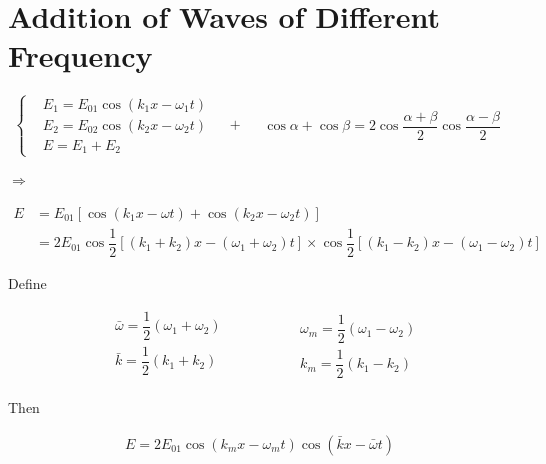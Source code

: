 \section{Addition of Waves of Different Frequency}

\begin{equation*}
  \left\{
    \begin{aligned}
      & E_1 = E_{01} \cos \left( k_1 x - \omega_1 t \right) \\
      & E_2 = E_{02} \cos \left( k_2 x - \omega_2 t \right) \\
      & E = E_1 + E_2
    \end{aligned}
  \right.
  \quad + \quad 
  \begin{aligned}
    \cos \alpha + \cos \beta = 2 \cos \dfrac{\alpha + \beta}{2} \cos \dfrac{\alpha - \beta}{2}  
  \end{aligned}
\end{equation*}

$\Rightarrow$

\begin{equation*}
  \begin{aligned}
    E &= E_{01} \left[ \cos \left( k_1 x - \omega t \right) + \cos \left( k_2 x - \omega_2 t \right) \right] \\
    &= 2 E_{01} \cos \dfrac{1}{2} \left[ \left( k_1 + k_2 \right) x - \left( \omega_1 + \omega_2 \right) t \right] \times \cos \dfrac{1}{2} \left[ \left( k_1 - k_2 \right) x - \left( \omega_1 - \omega_2 \right) t \right]  
  \end{aligned}
\end{equation*}

Define

\begin{equation*}
  \begin{aligned}
    & \bar{\omega} = \dfrac{1}{2} \left( \omega_1 + \omega_2 \right) \\ 
    & \bar{k} = \dfrac{1}{2} \left( k_1 + k_2 \right) \\
  \end{aligned}
  \quad\quad\quad\quad
  \begin{aligned}
      & \omega_m = \dfrac{1}{2} \left( \omega_1 - \omega_2 \right) \\ 
      & k_m = \dfrac{1}{2} \left( k_1 - k_2 \right) 
  \end{aligned}
\end{equation*}

Then

\begin{equation*}
  \begin{aligned}
    E = 2 E_{01} \cos \left( k_m x - \omega_m t \right) \cos \left( \bar{k} x - \bar{\omega} t \right)
  \end{aligned}
\end{equation*}

